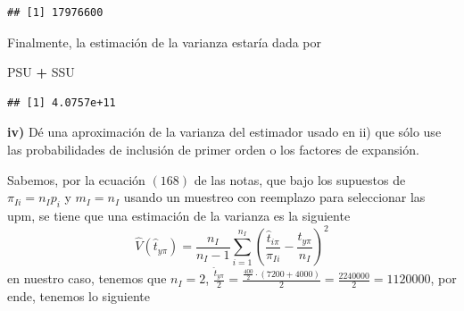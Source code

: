 \documentclass[
]{article}
\newenvironment{Shaded}{\begin{snugshade}}{\end{snugshade}}
\newcommand{\DataTypeTok}[1]{\textcolor[rgb]{0.13,0.29,0.53}{#1}}
\newcommand{\DecValTok}[1]{\textcolor[rgb]{0.00,0.00,0.81}{#1}}
\newcommand{\KeywordTok}[1]{\textcolor[rgb]{0.13,0.29,0.53}{\textbf{#1}}}
\newcommand{\NormalTok}[1]{#1}
\newcommand{\OperatorTok}[1]{\textcolor[rgb]{0.81,0.36,0.00}{\textbf{#1}}}
\newcommand{\StringTok}[1]{\textcolor[rgb]{0.31,0.60,0.02}{#1}}
\begin{document}
\begin{Shaded}
\end{Shaded}

\begin{verbatim}
## [1] 17976600
\end{verbatim}

Finalmente, la estimación de la varianza estaría dada por

\begin{Shaded}
\begin{Highlighting}[]
\NormalTok{PSU }\OperatorTok{+}\StringTok{ }\NormalTok{SSU}
\end{Highlighting}
\end{Shaded}

\begin{verbatim}
## [1] 4.0757e+11
\end{verbatim}

\textbf{iv)} Dé una aproximación de la varianza del estimador usado en
ii) que sólo use las probabilidades de inclusión de primer orden o los
factores de expansión.

Sabemos, por la ecuación \((168)\) de las notas, que bajo los supuestos
de \(\pi_{Ii} = n_I p_i\) y \(m_I = n_I\) usando un muestreo con
reemplazo para seleccionar las upm, se tiene que una estimación de la
varianza es la siguiente
\[ \widehat{V}(\widehat{t}_{y\pi}) = \frac{n_I}{n_I - 1}\sum_{i = 1}^{n_I}\left(\frac{\widehat{t}_{i\pi}}{\pi_{Ii}} - \frac{\widehat{t}_{y\pi}}{n_I} \right)^2\]
en nuestro caso, tenemos que \(n_I = 2\),
\(\frac{\widehat{t}_{y\pi}}{2} = \frac{\frac{400}{2} \cdot (7200 + 4000)}{2} = \frac{2240000}{2} = 1120000\),
por ende, tenemos lo siguiente
\end{document}
